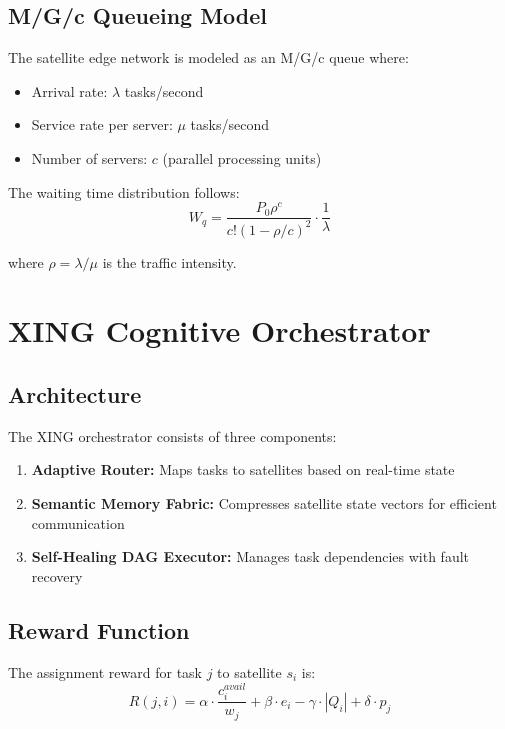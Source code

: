\documentclass[sigconf]{acmart}
\begin{document}
\subsection{M/G/c Queueing Model}

The satellite edge network is modeled as an M/G/c queue where:
\begin{itemize}
\item Arrival rate: $\lambda$ tasks/second
\item Service rate per server: $\mu$ tasks/second
\item Number of servers: $c$ (parallel processing units)
\end{itemize}

The waiting time distribution follows:
\begin{equation}
W_q = \frac{P_0 \rho^c}{c!(1-\rho/c)^2} \cdot \frac{1}{\lambda}
\end{equation}

where $\rho = \lambda/\mu$ is the traffic intensity.

\section{XING Cognitive Orchestrator}

\subsection{Architecture}

The XING orchestrator consists of three components:
\begin{enumerate}
\item \textbf{Adaptive Router:} Maps tasks to satellites based on real-time state
\item \textbf{Semantic Memory Fabric:} Compresses satellite state vectors for efficient communication
\item \textbf{Self-Healing DAG Executor:} Manages task dependencies with fault recovery
\end{enumerate}

\subsection{Reward Function}

The assignment reward for task $j$ to satellite $s_i$ is:
\begin{equation}
R(j, i) = \alpha \cdot \frac{c_i^{avail}}{w_j} + \beta \cdot e_i - \gamma \cdot |Q_i| + \delta \cdot p_j
\end{equation}
\end{document}
